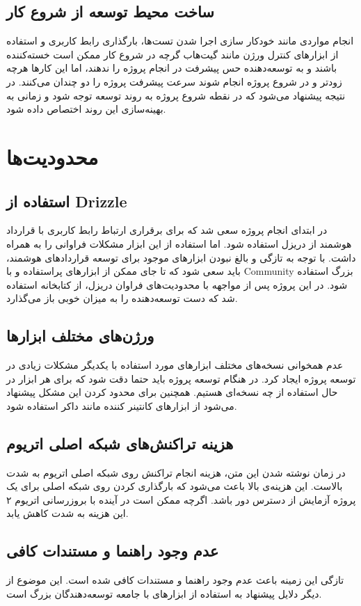 \subsection{ساخت محیط توسعه از شروع کار}
انجام مواردی مانند خودکار سازی اجرا شدن تست‌ها،
بارگذاری رابط کاربری و استفاده از ابزارهای کنترل ورژن مانند گیت‌هاب
گرچه در شروع کار ممکن است خسته‌کننده باشند و به توسعه‌دهنده حس پیشرفت در انجام پروژه را ندهند، اما
این کارها هرچه زودتر و در شروع پروژه انجام شوند سرعت پیشرفت پروژه را دو چندان می‌کنند.
در نتیجه پیشنهاد می‌شود که در نقطه شروع پروژه به روند توسعه توجه شود و زمانی به
بهینه‌سازی این روند اختصاص داده شود.


\section{محدودیت‌ها}

\subsection{استفاده از
\gls{Drizzle}
}
در ابتدای انجام پروژه سعی شد که برای برقراری ارتباط رابط کاربری با قرارداد هوشمند از دریزل استفاده شود.
اما استفاده از این ابزار مشکلات فراوانی را به همراه داشت.
با توجه به تازگی و بالغ نبودن ابزارهای موجود برای توسعه قراردادهای هوشمند،
باید سعی شود که تا جای ممکن از ابزارهای پراستفاده و با
\gls{Community}
بزرگ استفاده شود. در این پروژه پس از مواجهه با محدودیت‌های فراوان دریزل،
از کتابخانه‌  استفاده شد که دست توسعه‌دهنده را به میزان خوبی باز می‌گذارد.

\subsection{ورژن‌های مختلف ابزارها}
عدم همخوانی نسخه‌های مختلف ابزارهای مورد استفاده با یکدیگر مشکلات زیادی در توسعه پروژه ایجاد کرد.
در هنگام توسعه پروژه باید حتما دقت شود که برای هر ابزار در حال استفاده از چه نسخه‌ای هستیم.
همچنین برای محدود کردن این مشکل پیشنهاد می‌شود از ابزارهای کانتینر کننده مانند داکر استفاده شود.

\subsection{هزینه تراکنش‌های شبکه اصلی اتریوم}
در زمان نوشته شدن این متن، هزینه انجام تراکنش روی شبکه اصلی اتریوم به شدت بالاست.
این هزینه‌ی بالا باعث می‌شود که بارگذاری کردن روی شبکه اصلی برای یک پروژه آزمایش از دسترس دور باشد.
اگرچه ممکن است در آینده با بروزرسانی اتریوم ۲ این هزینه به شدت کاهش یابد.

\subsection{عدم وجود راهنما و مستندات کافی}
تازگی این زمینه باعث عدم وجود راهنما و مستندات کافی شده است.
این موضوع از دیگر دلایل پیشنهاد به استفاده از ابزارهای با جامعه توسعه‌دهندگان بزرگ است.
